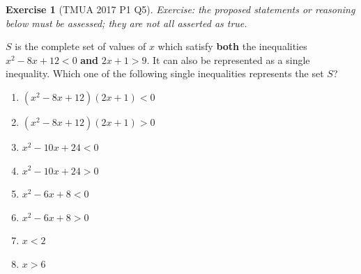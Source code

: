\documentclass[11pt]{article}
\theoremstyle{definition}
\newtheorem{example}[theorem]{Exercise}
\theoremstyle{remark}
\newcommand{\pqty}[1]{\left(#1\right)}
\begin{document}
\begin{example}[TMUA 2017 P1 Q5]\label{tmua-1-unit-025}
\textit{Exercise: the proposed statements or reasoning below must be assessed; they are not all asserted as true.}\par

    \(S\) is the complete set of values of \(x\) which satisfy \textbf{both} the inequalities \(x^2 - 8x + 12 < 0\) \textbf{and} \(2x + 1 > 9\). It can also be represented as a single inequality. Which one of the following single inequalities represents the set \(S\)?

    \begin{enumerate}
        \item \(\pqty{x^2 - 8x + 12} \pqty{2x + 1} < 0\)
        \item \(\pqty{x^2 - 8x + 12} \pqty{2x + 1} > 0\)
        \item \(x^2 - 10 x + 24 < 0\)
        \item \(x^2 - 10 x + 24 > 0\)
        \item \(x^2 - 6 x + 8 < 0\)
        \item \(x^2 - 6 x + 8 > 0\)
        \item \(x < 2\)
        \item \(x > 6\)
    \end{enumerate}
\end{example}
\end{document}
